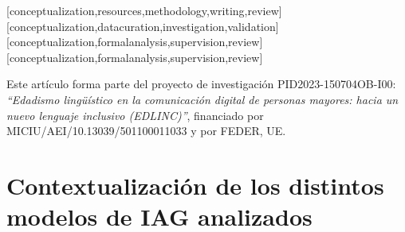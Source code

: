 \documentclass[spanish]{textolivre}
\begin{document}
\printbibliography\label{sec-bib}


\begin{contributors}
[conceptualization,resources,methodology,writing,review]
[conceptualization,datacuration,investigation,validation]
[conceptualization,formalanalysis,supervision,review]
[conceptualization,formalanalysis,supervision,review]

\end{contributors}

\begin{dataavailability}
\end{dataavailability}

\begin{funding}
Este artículo forma parte del proyecto de investigación PID2023-150704OB-I00: \textit{``Edadismo lingüístico en la comunicación digital de personas mayores: hacia un nuevo lenguaje inclusivo (EDLINC)''}, financiado por MICIU/AEI/10.13039/501100011033 y por FEDER, UE.

\end{funding}
\newpage
\appendix 
\section{Contextualización de los distintos modelos de IAG analizados}\label{anexo-1}
\end{document}
